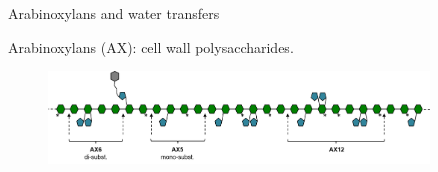 \documentclass[10pt]{beamer}
\begin{document}
\begin{frame}{Arabinoxylans and water transfers}

  \alert{Arabinoxylans (AX)}: cell wall polysaccharides.
  \vspace{-0.2cm}
  \begin{figure}[ht]
    \centering
    \includegraphics[width=0.9\textwidth]{fig/AX}
  \end{figure}


 
  


\end{frame}
\end{document}
